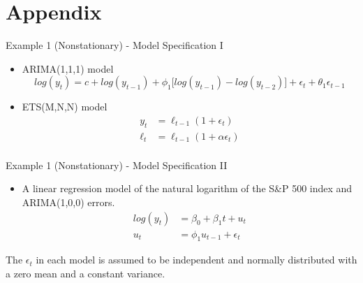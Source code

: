 \section{Appendix}

\begin{frame}{Example 1 (Nonstationary) - Model Specification I}
    
    \begin{itemize}
    \item ARIMA(1,1,1) model 
        \begin{equation*}
        log(y_t) = c + log(y_{t-1}) + \phi_1\big[log(y_{t-1})-log(y_{t-2})\big] + \epsilon_t + \theta_1\epsilon_{t-1}
        \end{equation*}
        
    \item ETS(M,N,N) model
        \begin{align*}
        y_t &= \ell_{t-1} (1+\epsilon_t) \\
        \ell_t &= \ell_{t-1} (1+\alpha \epsilon_t) \\
        \end{align*}
    \end{itemize}

\end{frame}



\begin{frame}{Example 1 (Nonstationary) - Model Specification II}

    \begin{itemize}
    \item A linear regression model of the natural logarithm of the S\&P 500 index and ARIMA(1,0,0) errors.
        \begin{align*}
        log(y_t) &= \beta_0 + \beta_1 t + u_t \\
        u_t &= \phi_1 u_{t-1} + \epsilon_t
        \end{align*}
    \end{itemize}

The $\epsilon_t$ in each model is assumed to be independent and normally distributed with a zero mean and a constant variance.

\end{frame}



